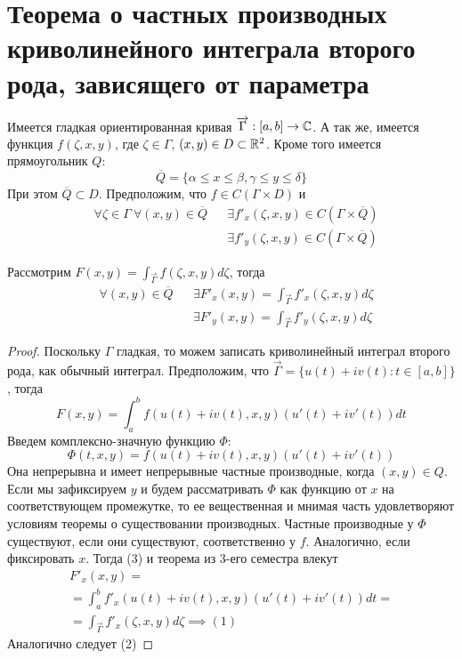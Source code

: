 \documentclass[main]{subfiles}
\begin{document}
\section{Теорема о частных производных криволинейного интеграла второго рода, зависящего от параметра}
\begin{theorem}
    Имеется гладкая ориентированная кривая $\overrightarrow{\Gamma}: [a, b] \to \mathbb{C}$.
    А так же, имеется функция $f(\zeta, x,y)$, где $\zeta \in \Gamma$, $(x,y) \in D \subset \mathbb{R}^2$.
    Кроме того имеется прямоугольник $Q$:
    \[\overline{Q} = \{\alpha \le x \le \beta,  \gamma\le y \le \delta\}\]
    При этом $\overline{Q} \subset D$.
    Предположим, что $f \in C(\Gamma \times D)$ и
    \begin{align*}
         & \forall \zeta \in \Gamma\ \forall (x,y) \in \overline{Q} &  & \exists f'_x (\zeta, x,y) \in C(\Gamma \times \overline{Q}) \\
         &                                                          &  & \exists f'_y (\zeta, x,y) \in C(\Gamma \times \overline{Q})
    \end{align*}

    Рассмотрим $F (x,y) = \int_{\overrightarrow{\Gamma}} f(\zeta, x, y)d \zeta$, тогда
    \begin{align*}
         & \forall (x,y) \in \overline{Q} &  & \exists F'_x(x,y) = \int_{\overrightarrow{\Gamma}} f'_x (\zeta, x,y) d \zeta \tag{1} \\
         &                                &  & \exists F'_y(x,y) = \int_{\overrightarrow{\Gamma}} f'_y (\zeta, x,y) d \zeta \tag{2}
    \end{align*}
\end{theorem}
\begin{proof}
    Поскольку $\Gamma$ гладкая, то можем записать криволинейный интеграл второго рода, как обычный интеграл.
    Предположим, что $\overrightarrow{\Gamma} = \{u(t) + i v(t): t\in [a,b]\}$, тогда
    \[F(x,y) = \int_{a}^{b} f(u(t) + i v(t),x,y)(u'(t) + i v'(t))dt \tag{3} \]
    Введем комплексно-значную функцию $\Phi$:
    \[\Phi (t, x, y) = f(u(t) + i v(t),x,y)(u'(t) + i v'(t))\]
    Она непрерывна и имеет непрерывные частные производные, когда $(x,y) \in Q$.
    Если мы зафиксируем $y$ и будем рассматривать $\Phi$ как функцию от $x$ на соответствующем промежутке, то ее вещественная и мнимая часть удовлетворяют условиям теоремы о существовании производных.
    Частные производные у $\Phi$ существуют, если они существуют, соответственно у $f$.
    Аналогично, если фиксировать $x$.
    Тогда (3) и теорема из 3-его семестра влекут
    \begin{multline*}
        F'_x (x,y) = \\
        = \int_{a}^{b} f'_x(u(t) + i v(t),x,y)(u'(t) + i v'(t)) dt = \\
        = \int_{\overrightarrow{\Gamma}} f'_x(\zeta, x, y) d\zeta \implies (1)
    \end{multline*}
    Аналогично следует (2)
\end{proof}
\end{document}
